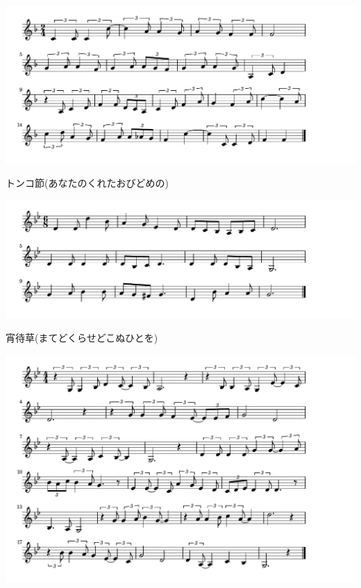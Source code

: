 \documentclass[a4paper]{ltjsarticle}
\begin{document}
\includegraphics[clip]{tonkobushi_crop.pdf}

\vspace{-10mm} \hspace{10mm}
トンコ節(あなたのくれたおびどめの)

\includegraphics[clip]{yoimachigusa_crop.pdf}

\vspace{-10mm} \hspace{10mm}
宵待草(まてどくらせどこぬひとを)

\includegraphics[clip]{natsukashinoblues_crop.pdf}
\end{document}
